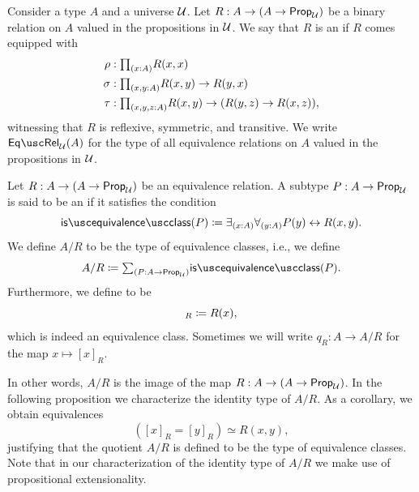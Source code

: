 \begin{defn}\label{defn:eq_rel}
Consider a type $A$ and a universe $\mathcal{U}$. Let $R:A\to (A\to\mathsf{Prop}_{\mathcal{U}})$ be a binary relation on $A$ valued in the propositions in $\mathcal{U}$. We say that $R$ is an  if $R$ comes equipped with
\begin{align*}
\rho & : \prd{x:A}R(x,x) \\*
\sigma & : \prd{x,y:A} R(x,y)\to R(y,x) \\*
\tau & : \prd{x,y,z:A} R(x,y)\to (R(y,z)\to R(x,z)),
\end{align*}
witnessing that $R$ is reflexive, symmetric, and transitive. We write $\eqrel_\UU(A)$ for the type of all equivalence relations on $A$ valued in the propositions in $\mathcal{U}$.
\end{defn}

\begin{defn}
  Let $R:A\to (A\to\mathsf{Prop}_{\mathcal{U}})$ be an equivalence relation. A subtype $P:A\to \mathsf{Prop}_{\mathcal{U}}$ is said to be an  if it satisfies the condition
  \begin{equation*}
    \isequivalenceclass(P)\defeq\exists_{(x:A)}\forall_{(y:A)}P(y)\leftrightarrow R(x,y).
  \end{equation*}
  We define $A/R$ to be the type of equivalence classes, i.e., we define
  \begin{equation*}
    A/R\defeq \sm{P:A\to\prop_\UU}\isequivalenceclass(P).
  \end{equation*}
  Furthermore, we define  to be
  \begin{equation*}
    [x]_R\defeq R(x),
  \end{equation*}
  which is indeed an equivalence class. Sometimes we will write $q_R:A\to A/R$ for the map $x\mapsto [x]_R$.
\end{defn}

In other words, $A/R$ is the image of the map $R:A\to (A\to\mathsf{Prop}_{\mathcal{U}})$. In the following proposition we characterize the identity type of $A/R$. As a corollary, we obtain equivalences
\begin{equation*}
  ([x]_R=[y]_R)\simeq R(x,y),
\end{equation*}
justifying that the quotient $A/R$ is defined to be the type of equivalence classes. Note that in our characterization of the identity type of $A/R$ we make use of propositional extensionality.

